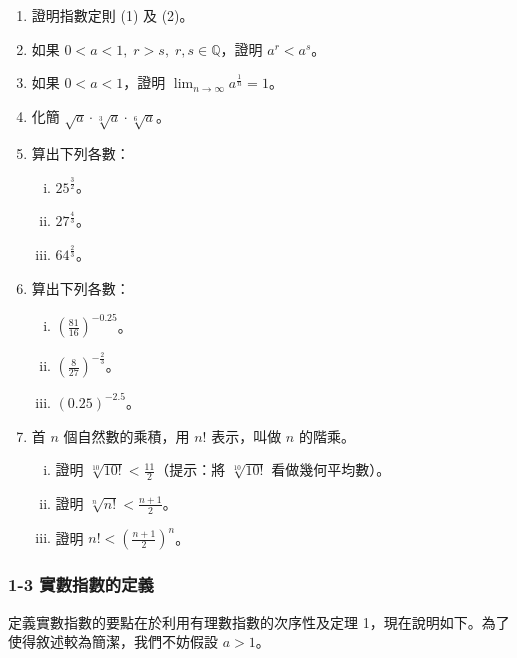 \begin{enumerate}
    \item 證明指數定則 (1) 及 (2)。
    \item 如果 $0 < a < 1,\; r > s,\; r, s \in \mathbb{Q}$，證明 $a^r < a^s$。
    \item 如果 $0 < a < 1$，證明 $\lim_{n\to\infty} a^{\frac{1}{n}} = 1$。
    \item 化簡 $\sqrt{a} \cdot \sqrt[3]{a} \cdot \sqrt[6]{a}$。
    \item 算出下列各數：
    \begin{enumerate}[(i)]
        \item $25^{\frac{3}{2}}$。
        \item $27^{\frac{4}{3}}$。
        \item $64^{\frac{2}{3}}$。
    \end{enumerate}
    \item 算出下列各數：
    \begin{enumerate}[(i)]
        \item $\left(\frac{81}{16}\right)^{-0.25}$。
        \item $\left(\frac{8}{27}\right)^{-\frac{2}{3}}$。
        \item $(0.25)^{-2.5}$。
    \end{enumerate}
    \item 首 $n$ 個自然數的乘積，用 $n!$ 表示，叫做 $n$ 的階乘。
    \begin{enumerate}[(i)]
        \item 證明 $\sqrt[10]{10!} < \frac{11}{2}$（提示：將 $\sqrt[10]{10!}$ 看做幾何平均數）。
        \item 證明 $\sqrt[n]{n!} < \frac{n+1}{2}$。
        \item 證明 $n! < \left(\frac{n+1}{2}\right)^n$。
    \end{enumerate}
\end{enumerate}

\subsubsection*{1-3 實數指數的定義}

定義實數指數的要點在於利用有理數指數的次序性及定理 1，現在說明如下。為了使得敘述較為簡潔，我們不妨假設 $a > 1$。

